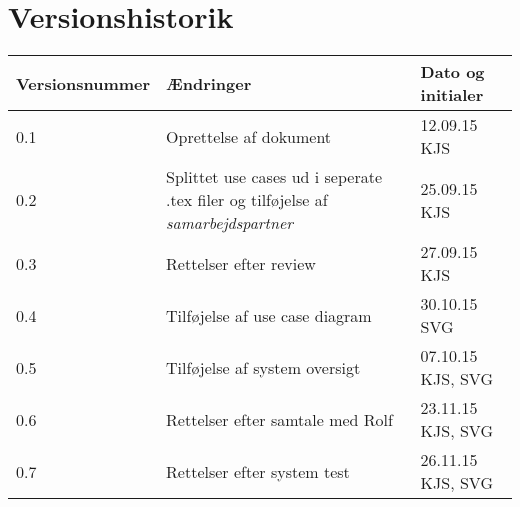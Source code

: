 	\section{Versionshistorik}
		\begin{longtable}{ |p{} |p{}| p{}|  } 
			\hline
			\rowcolor{usDef}
			\textbf{Versionsnummer} &  \textbf{Ændringer} & \textbf{Dato og initialer} \\
			\hline
			0.1 &  Oprettelse af dokument & 12.09.15 KJS \\
			\hline
			0.2 & Splittet use cases ud i seperate .tex filer og tilføjelse af \textit{samarbejdspartner}& 25.09.15 KJS \\
			\hline
			0.3 & Rettelser efter review & 27.09.15 KJS \\
			\hline
			0.4 &  Tilføjelse af use case diagram & 30.10.15 SVG \\
			\hline
			0.5 &  Tilføjelse af system oversigt & 07.10.15 KJS, SVG \\
			\hline
			0.6 &  Rettelser efter samtale med Rolf& 23.11.15 KJS, SVG \\
			\hline
			0.7 &  Rettelser efter system test& 26.11.15 KJS, SVG \\
			\hline
		\end{longtable}

	
